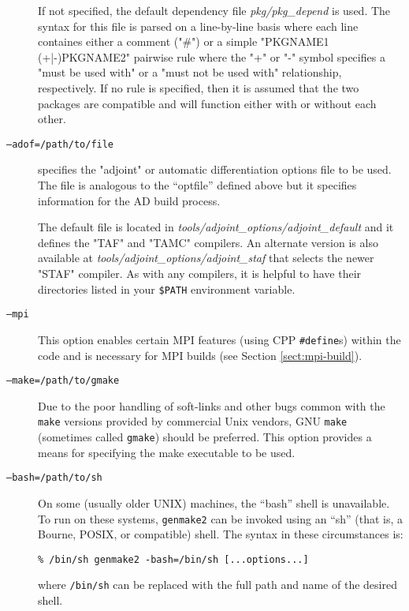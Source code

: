 \begin{description}
  If not specified, the default dependency file {\em pkg/pkg\_depend}
  is used.  The syntax for this file is parsed on a line-by-line basis
  where each line containes either a comment ("\#") or a simple
  "PKGNAME1 (+|-)PKGNAME2" pairwise rule where the "+" or "-" symbol
  specifies a "must be used with" or a "must not be used with"
  relationship, respectively.  If no rule is specified, then it is
  assumed that the two packages are compatible and will function
  either with or without each other.
  
\item[\texttt{--adof=/path/to/file}] specifies the "adjoint" or
  automatic differentiation options file to be used.  The file is
  analogous to the ``optfile'' defined above but it specifies
  information for the AD build process.
  
  The default file is located in {\em
    tools/adjoint\_options/adjoint\_default} and it defines the "TAF"
  and "TAMC" compilers.  An alternate version is also available at
  {\em tools/adjoint\_options/adjoint\_staf} that selects the newer
  "STAF" compiler.  As with any compilers, it is helpful to have their
  directories listed in your {\tt \$PATH} environment variable.
  
\item[\texttt{--mpi}] This option enables certain MPI features (using
  CPP \texttt{\#define}s) within the code and is necessary for MPI
  builds (see Section \ref{sect:mpi-build}).
  
\item[\texttt{--make=/path/to/gmake}] Due to the poor handling of
  soft-links and other bugs common with the \texttt{make} versions
  provided by commercial Unix vendors, GNU \texttt{make} (sometimes
  called \texttt{gmake}) should be preferred.  This option provides a
  means for specifying the make executable to be used.
  
\item[\texttt{--bash=/path/to/sh}] On some (usually older UNIX)
  machines, the ``bash'' shell is unavailable.  To run on these
  systems, \texttt{genmake2} can be invoked using an ``sh'' (that is,
  a Bourne, POSIX, or compatible) shell.  The syntax in these
  circumstances is:
  \begin{center}
    \texttt{\%  /bin/sh genmake2 -bash=/bin/sh [...options...]}
  \end{center}
  where \texttt{/bin/sh} can be replaced with the full path and name
  of the desired shell.

\end{description}


